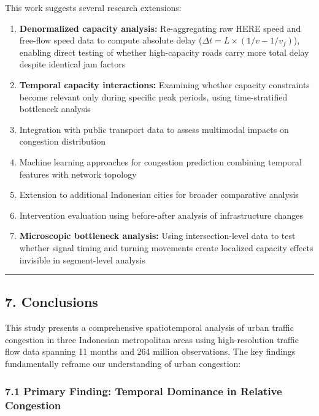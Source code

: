 This work suggests several research extensions:

\begin{enumerate}
\def\labelenumi{\arabic{enumi}.}
\tightlist
\item
  \textbf{Denormalized capacity analysis:} Re-aggregating raw HERE speed and free-flow speed data to compute absolute delay (\(\Delta t = L \times (1/v - 1/v_f)\)), enabling direct testing of whether high-capacity roads carry more total delay despite identical jam factors
\item
  \textbf{Temporal capacity interactions:} Examining whether capacity constraints become relevant only during specific peak periods, using time-stratified bottleneck analysis
\item
  Integration with public transport data to assess multimodal impacts on congestion distribution
\item
  Machine learning approaches for congestion prediction combining temporal features with network topology
\item
  Extension to additional Indonesian cities for broader comparative analysis
\item
  Intervention evaluation using before-after analysis of infrastructure changes
\item
  \textbf{Microscopic bottleneck analysis:} Using intersection-level data to test whether signal timing and turning movements create localized capacity effects invisible in segment-level analysis
\end{enumerate}

\begin{center}\rule{0.5\linewidth}{0.5pt}\end{center}

\subsection{7. Conclusions}\label{conclusions}

This study presents a comprehensive spatiotemporal analysis of urban traffic congestion in three Indonesian metropolitan areas using high-resolution traffic flow data spanning 11 months and 264 million observations. The key findings fundamentally reframe our understanding of urban congestion:

\subsubsection{7.1 Primary Finding: Temporal Dominance in Relative Congestion}\label{primary-finding-temporal-dominance-in-relative-congestion}

